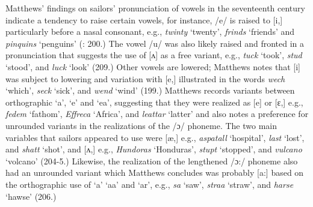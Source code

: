 Matthews’ findings on sailors’ pronunciation of vowels in the seventeenth century indicate a tendency to raise certain vowels, for instance, /e/ is raised to [i,] particularly before a nasal consonant, e.g., \textit{twinty} ‘twenty’, \textit{frinds} ‘friends’ and \textit{pinquins} ‘penguins’ (\citealt{Matthews1935}: 200.) The vowel /u/ was also likely raised and fronted in a pronunciation that suggests the use of [ʌ] as a free variant, e.g., \textit{tuck} ‘took’, \textit{stud} ‘stood’, and \textit{luck} ‘look’ (209.) Other vowels are lowered; Matthews notes that [i] was subject to lowering and variation with [e,] illustrated in the words \textit{wech} ‘which’, \textit{seck} ‘sick’, and \textit{wend} ‘wind’ (199.) Matthews records variants between orthographic ‘a’, ‘e’ and ‘ea’, suggesting that they were realized as [e] or [ɛ,] e.g., \textit{fedem} ‘fathom’, \textit{Effreca} ‘Africa’, and \textit{leattar} ‘latter’  and also notes a preference for unrounded variants in the realizations of the /ɔ/ phoneme. The two main variables that sailors appeared to use were [æ,] e.g., \textit{aspatall} ‘hospital’, \textit{last} ‘lost’, and \textit{shatt} ‘shot’, and [ʌ,] e.g., \textit{Hundoras} ‘Honduras’, \textit{stupt} ‘stopped’, and \textit{vulcano} ‘volcano’ (204-5.) Likewise, the realization of the lengthened /ɔ:/ phoneme also had an unrounded variant which Matthews concludes was probably [a:] based on the orthographic use of ‘a’ ‘aa’ and ‘ar’, e.g., \textit{sa} ‘saw’, \textit{straa} ‘straw’, and \textit{harse} ‘hawse’ (206.) 

